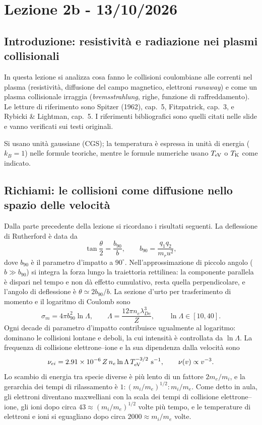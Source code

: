 \chapter{Lezione 2b - 13/10/2026}

\section{Introduzione: resistività e radiazione nei plasmi collisionali}
In questa lezione si analizza cosa fanno le collisioni coulombiane alle correnti nel plasma (resistività, diffusione del campo magnetico, elettroni \textit{runaway}) e come un plasma collisionale irraggia (\textit{bremsstrahlung}, righe, funzione di raffreddamento). Le letture di riferimento sono Spitzer (1962), cap.~5, Fitzpatrick, cap.~3, e Rybicki \& Lightman, cap.~5. I riferimenti bibliografici sono quelli citati nelle slide e vanno verificati sui testi originali.

Si usano unità gaussiane (CGS); la temperatura è espressa in unità di energia ($k_B=1$) nelle formule teoriche, mentre le formule numeriche usano $T_{\rm eV}$ o $T_{\rm K}$ come indicato.

\section{Richiami: le collisioni come diffusione nello spazio delle velocità}
Dalla parte precedente della lezione si ricordano i risultati seguenti. La deflessione di Rutherford è data da
\begin{equation}
\tan\frac{\theta}{2}=\frac{b_{90}}{b},\qquad b_{90}=\frac{q_1q_2}{m_ru^2},
\end{equation}
dove $b_{90}$ è il parametro d'impatto a $90^\circ$. Nell'approssimazione di piccolo angolo ($b\gg b_{90}$) si integra la forza lungo la traiettoria rettilinea: la componente parallela è dispari nel tempo e non dà effetto cumulativo, resta quella perpendicolare, e l'angolo di deflessione è $\theta\simeq 2b_{90}/b$.
La sezione d'urto per trasferimento di momento e il logaritmo di Coulomb sono
\begin{equation}
\sigma_m=4\pi b_{90}^2\ln\Lambda,\qquad \Lambda=\frac{12\pi n_e\lambda_{De}^3}{Z},\qquad \ln\Lambda\in[10,40].
\end{equation}
Ogni decade di parametro d'impatto contribuisce ugualmente al logaritmo: dominano le collisioni lontane e deboli, la cui intensità è controllata da $\ln\Lambda$.
La frequenza di collisione elettrone--ione e la sua dipendenza dalla velocità sono
\begin{equation}
\nu_{ei}=2.91\times10^{-6}\,Z\,n_e\ln\Lambda\,T_{\rm eV}^{-3/2}\ \mathrm{s^{-1}},\qquad \nu(v)\propto v^{-3}.
\end{equation}
Lo scambio di energia tra specie diverse è più lento di un fattore $2m_e/m_i$, e la gerarchia dei tempi di rilassamento è $1:(m_i/m_e)^{1/2}:m_i/m_e$.
Come detto in aula, gli elettroni diventano maxwelliani con la scala dei tempi di collisione elettrone--ione, gli ioni dopo circa $43\approx(m_i/m_e)^{1/2}$ volte più tempo, e le temperature di elettroni e ioni si eguagliano dopo circa $2000\approx m_i/m_e$ volte.

